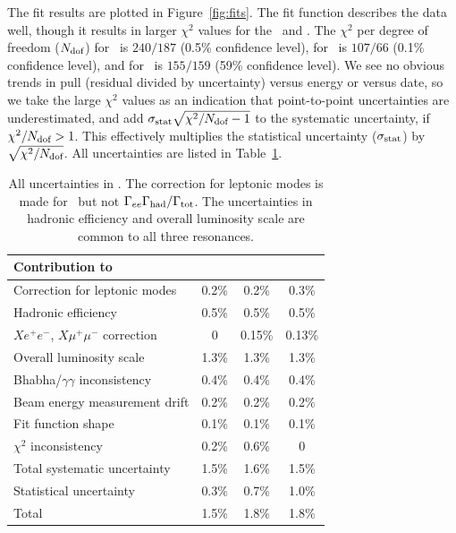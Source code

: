 \documentclass[aps,prd,preprint,superscriptaddress,tightenlines,nofootinbib]{revtex4}
\begin{document}
The fit results are plotted in Figure~\ref{fig:fits}.  The fit
function describes the data well, though it results in larger $\chi^2$
values for the \us\ and \uss.  The $\chi^2$ per degree of freedom
($N_{\mbox{\scriptsize dof}}$) for \us\ is $240/187$ (0.5\% confidence
level), for \uss\ is $107/66$ (0.1\% confidence level), and for \usss\
is $155/159$ (59\% confidence level).  We see no obvious trends in
pull (residual divided by uncertainty) versus energy or versus date,
so we take the large $\chi^2$ values as an indication that
point-to-point uncertainties are underestimated, and add
$\sigma_{\mbox{\scriptsize stat}}\sqrt{\chi^2/N_{\mbox{\scriptsize
dof}} - 1}$ to the systematic uncertainty, if
$\chi^2/N_{\mbox{\scriptsize dof}} > 1$.  This effectively multiplies
the statistical uncertainty ($\sigma_{\mbox{\scriptsize stat}}$) by
$\sqrt{\chi^2/N_{\mbox{\scriptsize dof}}}$.  All uncertainties are
listed in Table~\ref{tab:unc}.

\begin{table}
  \caption{\label{tab:unc} All uncertainties in \gee.  The correction
  for leptonic modes is made for \gee\ but not $\Gamma_{ee}\Gamma_{\mbox{\scriptsize had}}/\Gamma_{\mbox{\scriptsize tot}}$.  The
  uncertainties in hadronic efficiency and overall luminosity scale
  are common to all three resonances.}
  \renewcommand{\arraystretch}{1.25}
  \begin{tabular}{l c c c}
    \hline\hline Contribution to \gee & \hspace{0 cm}\us\hspace{0 cm} & \hspace{0 cm}\uss\hspace{0 cm} & \hspace{0 cm}\usss\hspace{0 cm} \\\hline
    Correction for leptonic modes        	   & 0.2\%  & 0.2\%  & 0.3\%  \\
    Hadronic efficiency                            & 0.5\%  & 0.5\%  & 0.5\%  \\
    $Xe^+e^-$, $X\mu^+\mu^-$ correction  	   & 0      & 0.15\% & 0.13\% \\
    Overall luminosity scale                       & 1.3\%  & 1.3\%  & 1.3\%  \\
    Bhabha/$\gamma\gamma$ inconsistency  	   & 0.4\%  & 0.4\%  & 0.4\%  \\
    Beam energy measurement drift \hspace{0.5 cm}  & 0.2\%  & 0.2\%  & 0.2\%  \\
    Fit function shape                   	   & 0.1\%  & 0.1\%  & 0.1\%  \\
    $\chi^2$ inconsistency               	   & 0.2\%  & 0.6\%  & 0      \\\hline
    Total systematic uncertainty         	   & 1.5\%  & 1.6\%  & 1.5\%  \\
    Statistical uncertainty              	   & 0.3\%  & 0.7\%  & 1.0\%  \\\hline
    Total                                	   & 1.5\%  & 1.8\%  & 1.8\%  \\\hline\hline
  \end{tabular}
\end{table}
\end{document}
